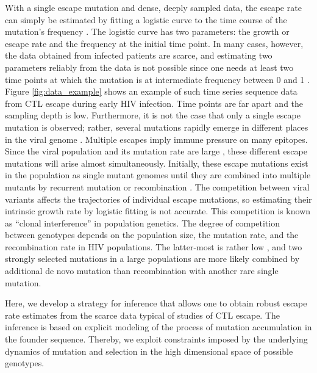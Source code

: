\documentclass{frontiers}
\begin{document}
With a single escape mutation and dense, deeply sampled data, the escape
rate can simply be estimated by fitting a logistic curve to the time
course of the mutation's frequency
\citep{ganusov_fitness_2011,Asquith:2006p28003}.  The logistic curve has
two parameters: the growth or escape rate and the frequency at the
initial time point. In many cases, however, the data obtained from
infected patients are scarce, and estimating two parameters reliably
from the data is not possible since one needs at least two time points
at which the mutation is at intermediate frequency between 0 and 1
\citep{ganusov_fitness_2011}. Figure \ref{fig:data_example} shows an
example of such time series sequence data from CTL escape during early
HIV infection. Time points are far apart and the sampling depth is
low. Furthermore, it is not the case that only a single escape mutation
is observed; rather, several mutations rapidly emerge in different
places in the viral genome
\citep{Goonetilleke:2009p42296,SalazarGonzalez:2009p35091}. Multiple
escapes imply immune pressure on many epitopes. Since the viral
population and its mutation rate are large
\citep{Perelson:1996p23158,Mansky:1995p38971}, these different escape
mutations will arise almost simultaneously. Initially, these escape
mutations exist in the population as single mutant genomes until they
are combined into multiple mutants by recurrent mutation or
recombination
\citep{ganusov_mathematical_2013,leviyang_computational_2013}. The
competition between viral variants affects the trajectories of
individual escape mutations, so estimating their intrinsic growth rate
by logistic fitting is not accurate. This competition is known as
``clonal interference'' in population genetics. The degree of competition between
genotypes depends on the population size, the mutation rate, and the
recombination rate in HIV populations. The latter-most is rather low
\citep{Neher:2010p32691,Batorsky:2011p40107}, and two strongly selected
mutations in a large populations are more likely combined by additional
de novo mutation than recombination with another rare single mutation.


Here, we develop a strategy for inference that allows one to obtain robust escape 
rate estimates
from the scarce data typical of studies of CTL escape. The inference is based on
explicit modeling of the process of mutation accumulation in the founder
sequence. Thereby, we exploit constraints imposed by the underlying dynamics of
mutation and selection in the high dimensional space of possible genotypes.
\end{document}
